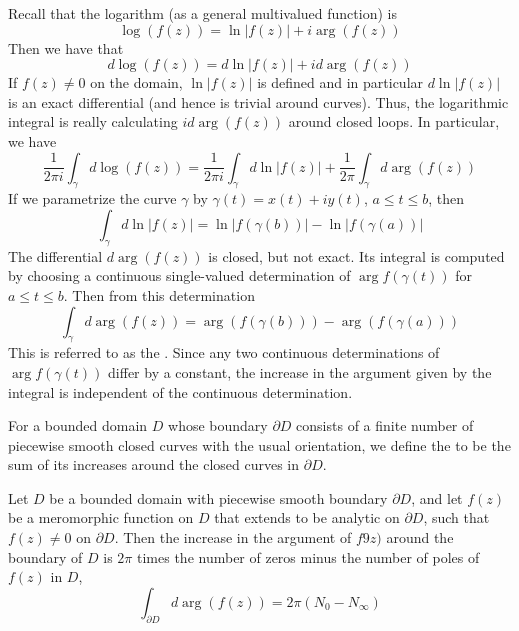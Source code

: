 \begin{remark}
    Recall that the logarithm (as a general multivalued function) is \begin{equation*}
        \log(f(z)) = \ln|f(z)| + i\arg(f(z))
    \end{equation*}
    Then we have that \begin{equation*}
        d\log(f(z)) = d\ln|f(z)| + id\arg(f(z))
    \end{equation*}
    If $f(z) \neq 0$ on the domain, $\ln|f(z)|$ is defined and in particular $d\ln|f(z)|$ is an exact differential (and hence is trivial around curves). Thus, the logarithmic integral is really calculating $id\arg(f(z))$ around closed loops. In particular, we have \begin{equation*}
        \frac{1}{2\pi i}\int_{\gamma}d\log(f(z)) = \frac{1}{2\pi i}\int_{\gamma}d\ln|f(z)| + \frac{1}{2\pi}\int_{\gamma}d\arg(f(z))
    \end{equation*}
    If we parametrize the curve $\gamma$ by $\gamma(t) = x(t)+iy(t)$, $a \leq t \leq b$, then \begin{equation*}
        \int_{\gamma}d\ln|f(z)| = \ln|f(\gamma(b))| - \ln|f(\gamma(a))|
    \end{equation*}
    The differential $d\arg(f(z))$ is closed, but not exact. Its integral is computed by choosing a continuous single-valued determination of $\arg f(\gamma(t))$ for $a \leq t \leq b$. Then from this determination \begin{equation*}
        \int_{\gamma}d\arg(f(z)) = \arg(f(\gamma(b))) - \arg(f(\gamma(a)))
    \end{equation*}
    This is referred to as the . Since any two continuous determinations of $\arg f(\gamma(t))$ differ by a constant, the increase in the argument given by the integral is independent of the continuous determination.
\end{remark}

For a bounded domain $D$ whose boundary $\partial D$ consists of a finite number of piecewise smooth closed curves with the usual orientation, we define the  to be the sum of its increases around the closed curves in $\partial D$.

\begin{theorem}
    Let $D$ be a bounded domain with piecewise smooth boundary $\partial D$, and let $f(z)$ be a meromorphic function on $D$ that extends to be analytic on $\partial D$, such that $f(z) \neq 0$ on $\partial D$. Then the increase in the argument of $f9z)$ around the boundary of $D$ is $2\pi$ times the number of zeros minus the number of poles of $f(z)$ in $D$,\begin{equation*}
        \int_{\partial D}d\arg(f(z)) = 2\pi(N_0-N_{\infty})
    \end{equation*}
\end{theorem}


